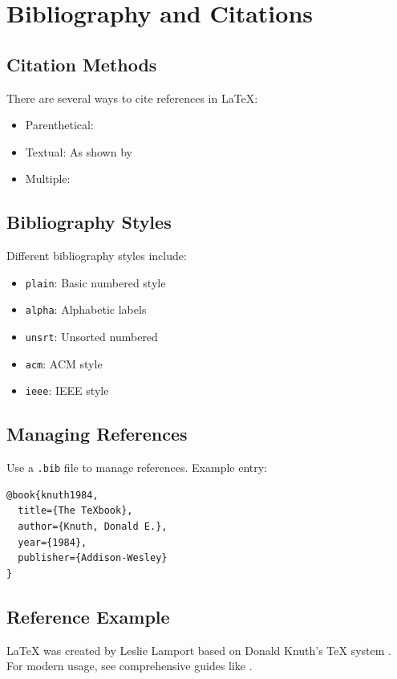 \chapter{Bibliography and Citations}

\section{Citation Methods}
There are several ways to cite references in \LaTeX{}:

\begin{itemize}
    \item Parenthetical: \nolinebreak\cite{knuth1984}
    \item Textual: As shown by \nolinebreak\cite{lamport1994}
    \item Multiple: \nolinebreak\cite{knuth1984, lamport1994}
\end{itemize}

\section{Bibliography Styles}
Different bibliography styles include:

\begin{itemize}
    \item \texttt{plain}: Basic numbered style
    \item \texttt{alpha}: Alphabetic labels
    \item \texttt{unsrt}: Unsorted numbered
    \item \texttt{acm}: ACM style
    \item \texttt{ieee}: IEEE style
\end{itemize}

\section{Managing References}
Use a \texttt{.bib} file to manage references. Example entry:

\begin{verbatim}
@book{knuth1984,
  title={The TeXbook},
  author={Knuth, Donald E.},
  year={1984},
  publisher={Addison-Wesley}
}
\end{verbatim}

\section{Reference Example}
\LaTeX{} was created by Leslie Lamport \nolinebreak\cite{lamport1994} based on 
Donald Knuth's \TeX{} system \nolinebreak\cite{knuth1984}. For modern usage, 
see comprehensive guides like \nolinebreak\cite{oetiker1995}.